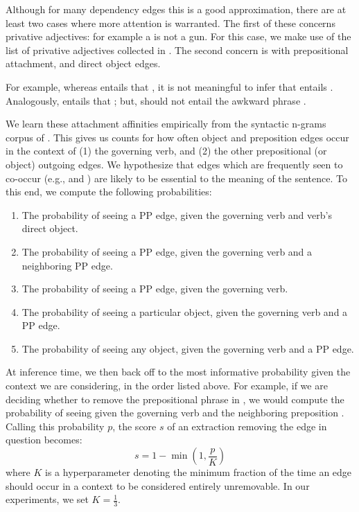 Although for many dependency edges this is a good approximation,
  there are at least two cases where more attention is warranted.
The first of these concerns privative adjectives: for example a 
  is not a gun.
For this case, we make use of the list of privative adjectives collected
  in .
The second concern is with prepositional attachment, and direct object
  edges.

For example, whereas  entails
  that , it is not meaningful to infer that
   entails .
Analogously,  entails that ; but,  should not entail the
  awkward phrase .

We learn these attachment affinities empirically from the syntactic n-grams
  corpus of .
This gives us counts for how often object and preposition edges occur in the
  context of (1) the governing verb, and (2) the other prepositional (or
  object) outgoing edges.
We hypothesize that edges which are frequently seen to co-occur 
  (e.g.,  and ) are likely
  to be essential to the meaning of the sentence.
To this end, we compute the following probabilities:

\begin{enumerate}
  \item The probability of seeing a PP edge, given the governing verb
        and verb's direct object.
  \item The probability of seeing a PP edge, given the governing verb
        and a neighboring PP edge.
  \item The probability of seeing a PP edge, given the governing verb.
  \item The probability of seeing a particular object, given the governing
        verb and a PP edge.
  \item The probability of seeing any object, given the governing
        verb and a PP edge.
\end{enumerate}

At inference time, we then back off to the most informative probability
  given the context we are considering, in the order listed above.
For example, if we are deciding whether to remove the prepositional phrase
  in , we would compute
  the probability of seeing  given the governing verb
   and the neighboring preposition .
Calling this probability $p$, the score $s$ of an extraction removing the edge
  in question becomes:
\begin{equation*}
  s = 1 - \min(1, \frac{p}{K})
\end{equation*}
where $K$ is a hyperparameter denoting the minimum fraction of the time an
  edge should occur in a context to be considered entirely unremovable.
In our experiments, we set $K=\frac{1}{3}$.


